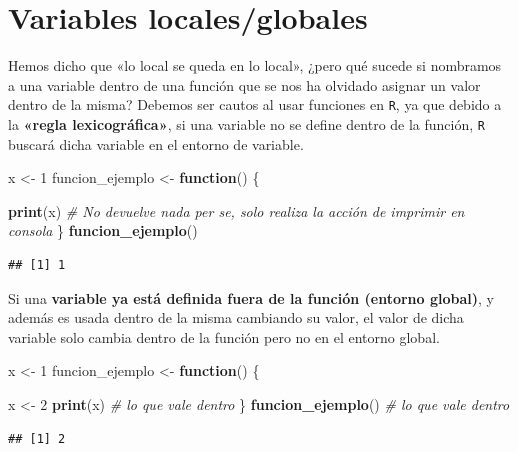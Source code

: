 \documentclass[11pt,]{book}
\newenvironment{Shaded}{\begin{snugshade}}{\end{snugshade}}
\newcommand{\CommentTok}[1]{\textcolor[rgb]{0.37,0.37,0.37}{\textit{#1}}}
\newcommand{\ControlFlowTok}[1]{\textcolor[rgb]{0.27,0.27,0.27}{\textbf{#1}}}
\newcommand{\DecValTok}[1]{\textcolor[rgb]{0.06,0.06,0.06}{#1}}
\newcommand{\KeywordTok}[1]{\textcolor[rgb]{0.27,0.27,0.27}{\textbf{#1}}}
\newcommand{\NormalTok}[1]{#1}
\newcommand{\StringTok}[1]{\textcolor[rgb]{0.5,0.5,0.5}{#1}}
\begin{document}
\hypertarget{variables-localesglobales}{%
\section{Variables locales/globales}\label{variables-localesglobales}}

Hemos dicho que «lo local se queda en lo local», ¿pero qué sucede si nombramos a una variable dentro de una función que se nos ha olvidado asignar un valor dentro de la misma? Debemos ser cautos al usar funciones en \texttt{R}, ya que debido a la \textbf{«regla lexicográfica»}, si una variable no se define dentro de la función, \texttt{R} buscará dicha variable en el entorno de variable.

\begin{Shaded}
\begin{Highlighting}[]
\NormalTok{x <-}\StringTok{ }\DecValTok{1}
\NormalTok{funcion_ejemplo <-}\StringTok{ }\ControlFlowTok{function}\NormalTok{() \{}
    
  \KeywordTok{print}\NormalTok{(x) }\CommentTok{# No devuelve nada per se, solo realiza la acción de imprimir en consola}
\NormalTok{\}}
\KeywordTok{funcion_ejemplo}\NormalTok{()}
\end{Highlighting}
\end{Shaded}

\begin{verbatim}
## [1] 1
\end{verbatim}

Si una \textbf{variable ya está definida fuera de la función (entorno global)}, y además es usada dentro de la misma cambiando su valor, el valor de dicha variable solo cambia dentro de la función pero no en el entorno global.

\begin{Shaded}
\begin{Highlighting}[]
\NormalTok{x <-}\StringTok{ }\DecValTok{1}
\NormalTok{funcion_ejemplo <-}\StringTok{ }\ControlFlowTok{function}\NormalTok{() \{}
    
\NormalTok{  x <-}\StringTok{ }\DecValTok{2}
  \KeywordTok{print}\NormalTok{(x) }\CommentTok{# lo que vale dentro}
\NormalTok{\}}
\KeywordTok{funcion_ejemplo}\NormalTok{() }\CommentTok{# lo que vale dentro}
\end{Highlighting}
\end{Shaded}

\begin{verbatim}
## [1] 2
\end{verbatim}
\end{document}
